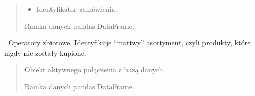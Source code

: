 \documentclass[a4paper,11pt,english,openany,oneside]{sphinxmanual}
\begin{document}
\begin{savenotes}
\begin{fulllineitems}
\begin{quote}
\begin{description}
\begin{itemize}
\item {} 
\sphinxAtStartPar
{} \textendash{} Identyfikator zamówienia.

\end{itemize}

\sphinxAtStartPar
Ramka danych pandas.DataFrame.

\end{description}\end{quote}

\end{fulllineitems}\end{savenotes}


\begin{savenotes}\begin{fulllineitems}
\label{\detokenize{rozdzial_5/index:zapytania_postgresql.znajdz_produkty_bez_zamowien}}
\pysigstartsignatures
\pysiglinewithargsret
{}
{}
{}
\pysigstopsignatures
{}. Operatory zbiorowe.
Identyfikuje “martwy” asortyment, czyli produkty, które nigdy nie zostały kupione.

\sphinxAtStartPar
{}

\begin{sphinxVerbatim}[commandchars=\\\{\}]
\end{sphinxVerbatim}
\begin{quote}\begin{description}
\sphinxAtStartPar
{} \textendash{} Obiekt aktywnego połączenia z bazą danych.

\sphinxAtStartPar
Ramka danych pandas.DataFrame.

\end{description}\end{quote}

\end{fulllineitems}\end{savenotes}
\end{document}

